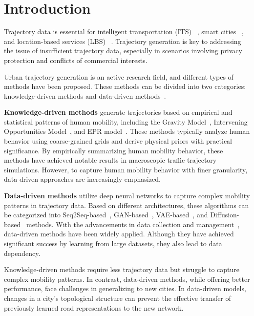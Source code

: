 \section{Introduction}
\label{sec:introduction}
Trajectory data is essential for intelligent transportation (ITS) ~\cite{wu2019learning, liu2024full}, smart cities ~\cite{hettige2024airphynet, ji2022precision}, and location-based services (LBS) ~\cite{lbs2018, lbs2021dgeye}. Trajectory generation is key to addressing the issue of insufficient trajectory data, especially in scenarios involving privacy protection and conflicts of commercial interests. 

Urban trajectory generation is an active research field, and different types of methods have been proposed. These methods can be divided into two categories: knowledge-driven methods and data-driven methods~\cite{kong2023mobility}.

\textbf{Knowledge-driven methods} generate trajectories based on empirical and statistical patterns of human mobility, including the Gravity Model~\cite{gravity_1946}, Intervening Opportunities Model~\cite{interventing}, and EPR model~\cite{epr_1, epr_2}. These methods typically analyze human behavior using coarse-grained grids and derive physical priors with practical significance. By empirically summarizing human mobility behavior, these methods have achieved notable results in macroscopic traffic trajectory simulations. However, to capture human mobility behavior with finer granularity, data-driven approaches are increasingly emphasized.


\textbf{Data-driven methods} utilize deep neural networks to capture complex mobility patterns in trajectory data. 
Based on different architectures, these algorithms can be categorized into Seq2Seq-based~\cite{Seq2Seq}, GAN-based~\cite{SeqGAN}, VAE-based~\cite{volunteer, SVAE}, and Diffusion-based~\cite{difftraj} methods.  
With the advancements in data collection and management~\cite{manage_chen2015efficient, manage_ding2018ultraman}, data-driven methods have been widely applied. Although they have achieved significant success by learning from large datasets, they also lead to data dependency. 

Knowledge-driven methods require less trajectory data but struggle to capture complex mobility patterns. In contrast, data-driven methods, while offering better performance, face challenges in generalizing to new cities. In data-driven models, changes in a city’s topological structure can prevent the effective transfer of previously learned road representations to the new network. 

